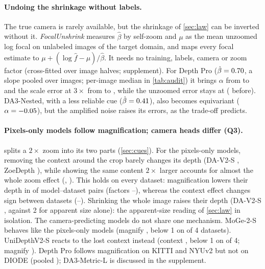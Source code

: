 \paragraph{Undoing the shrinkage without labels.}
The true camera is rarely available, but the shrinkage of \cref{sec:law} can be inverted without it.
\emph{FocalUnshrink} measures $\hat\beta$ by self-zoom and $\mu$ as the mean unzoomed log focal on unlabeled
images of the target domain, and maps every focal estimate to $\mu+(\log\hat f-\mu)/\hat\beta$. It needs no
training, labels, camera or zoom factor (cross-fitted over image halves; supplement). For Depth Pro
($\hat\beta=0.70$, a slope pooled over images; per-image median \DepthproBeta{} in \cref{tab:audit}) it brings $\alpha$ from \DepthproUnshrinkAlpha{} to
\DepthproUnshrinkAlphacorr{} and the scale error at $3\times$ from \DepthproUnshrinkScaleThree{} to
\DepthproUnshrinkScaleThreecorr, while the unzoomed error stays at \DepthproUnshrinkScaleOnecorr{}
(\DepthproUnshrinkScaleOne{} before). DA3-Nested, with a less reliable cue ($\hat\beta=0.41$),
also becomes equivariant ($\alpha=-0.05$), but the amplified noise raises its errors,
as the trade-off predicts.

\paragraph{Pixels-only models follow magnification; camera heads differ (Q3).}
 splits a $2\times$ zoom into its two parts (\cref{sec:cues}). For the pixels-only models,
removing the context around the crop barely changes its depth (DA-V2-S \DavTwoSCueContext, ZoeDepth
\ZoedepthCueContext), while showing the same content $2\times$ larger accounts for almost the whole zoom effect
(\DavTwoSCueMagnify, \ZoedepthCueMagnify). This holds on every dataset: magnification lowers their depth in
\cueMagnifyBelowOne{} of \cuePixPairs{} model--dataset pairs (factors \cueMagnifyMin--\cueMagnifyMax), whereas
the context effect changes sign between datasets (\cueContextMin--\cueContextMax). Shrinking the whole image
raises their depth (DA-V2-S \DavTwoSCueShrink, against 2 for apparent size alone): the apparent-size reading of
\cref{sec:law} in isolation. The camera-predicting models do not share one
mechanism. MoGe-2-S behaves like the pixels-only models (magnify \MogeTwoSCueMagnify, below 1 on
\MogeTwoSCueMagnifyBelowOne{} of 4 datasets). UniDepthV2-S reacts to the lost context instead (context
\UnidepthTwoSCueContext, below 1 on \UnidepthTwoSCueContextBelowOne{} of 4; magnify \UnidepthTwoSCueMagnify).
Depth Pro follows magnification on KITTI and NYUv2 but not on DIODE (pooled \DepthproCueMagnify); DA3-Metric-L
is discussed in the supplement.


